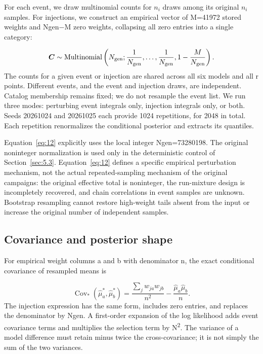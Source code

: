 \documentclass[a4paper,11pt]{article}
\begin{document}
For each event, we draw multinomial counts for \(n_{i}\) draws among its original \(n_{i}\) samples. For injections, we construct an empirical vector of M=41972 stored weights and Ngen\(-\)M zero weights, collapsing all zero entries into a single category:

\begin{equation}\label{eq:12}
\boldsymbol{C}\sim{\rm Multinomial}\left(N_{\rm gen};\frac{1}{N_{\rm gen}},\ldots,\frac{1}{N_{\rm gen}},1-\frac{M}{N_{\rm gen}}\right).
\end{equation}
The counts for a given event or injection are shared across all six models and all r points. Different events, and the event and injection draws, are independent. Catalog membership remains fixed; we do not resample the event list. We run three modes: perturbing event integrals only, injection integrals only, or both. Seeds 20261024 and 20261025 each provide 1024 repetitions, for 2048 in total. Each repetition renormalizes the conditional posterior and extracts its quantiles.

Equation~\eqref{eq:12} explicitly uses the local integer Ngen=73280198. The original noninteger normalization is used only in the deterministic control of Section~\ref{sec:5.3}. Equation~\eqref{eq:12} defines a specific empirical perturbation mechanism, not the actual repeated-sampling mechanism of the original campaigns: the original effective total is noninteger, the run-mixture design is incompletely recovered, and chain correlations in event samples are unknown. Bootstrap resampling cannot restore high-weight tails absent from the input or increase the original number of independent samples.

\subsection{Covariance and posterior shape}\label{sec:6.2}
For empirical weight columns a and b with denominator n, the exact conditional covariance of resampled means is

\begin{equation}\label{eq:13}
\operatorname{Cov}_*(\widehat{\mu}_a^*,\widehat{\mu}_b^*)=\frac{\sum_j w_{ja}w_{jb}}{n^2}-\frac{\widehat{\mu}_a\widehat{\mu}_b}{n}.
\end{equation}
The injection expression has the same form, includes zero entries, and replaces the denominator by Ngen. A first-order expansion of the log likelihood adds event covariance terms and multiplies the selection term by N\textsuperscript{2}. The variance of a model difference must retain minus twice the cross-covariance; it is not simply the sum of the two variances.
\end{document}
